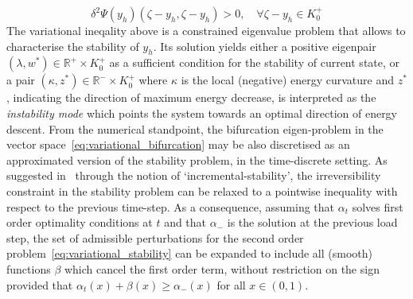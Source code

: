 \begin{equation}
     \label{eq:variational_stability}
     \delta^2 \Psi(y_h)(\zeta - y_h,  \zeta - y_h)  > 0, \quad \forall \zeta-y_h \in K^+_{0}
 \end{equation}
The variational ineqality above is a constrained eigenvalue problem that allows to characterise the stability of $y_h$. Its solution yields either a positive eigenpair $(\lambda, w^*)\in \mathbb{R}^+\times K^+_0$ as a sufficient condition for the stability of current state, or a pair $(\kappa, z^*)\in \mathbb{R}^-\times K^+_0$ where $\kappa$ is the local (negative) energy curvature and $z^*$, indicating the direction of maximum energy decrease, is interpreted as the \emph{instability mode} which points the system towards an optimal direction of energy descent. 
From the numerical standpoint, the bifurcation eigen-problem in the vector space~\eqref{eq:variational_bifurcation} may be also discretised as an approximated version of the stability problem, in the time-discrete setting. As suggested in~\cite{Baldelli2021-gc} through the notion of `incremental-stability', the irreversibility constraint in the stability problem can be relaxed to a pointwise inequality with respect to the previous time-step. As a consequence, assuming that $\alpha_t$ solves first order optimality conditions at $t$ and that $\alpha_-$ is the solution at the previous load step, the set of admissible perturbations for the second order problem~\eqref{eq:variational_stability} can be expanded to include all (smooth) functions $\beta$ which cancel the first order term, without restriction on the sign provided that $\alpha_t(x) + \beta(x) \geq \alpha_-(x)$ for all $x\in (0, 1)$.
